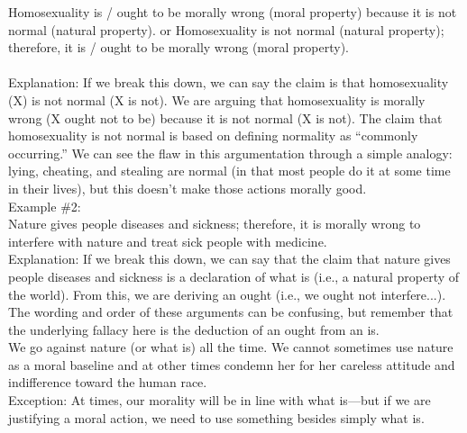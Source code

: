 \documentclass[a4paper,12pt,single,pdftex]{scrartcl}
\begin{document}
{    
       
    
    
      Homosexuality is / ought to be morally wrong (moral property) because it is not normal (natural property). \newline
or \newline
Homosexuality is not normal (natural property); therefore, it is / ought to be morally wrong (moral property).
    \\

    
       
    \\

    
      
        Explanation: If we break this down, we can say the claim is that homosexuality (X) is not normal (X is not). We are arguing that homosexuality is morally wrong (X ought not to be) because it is not normal (X is not). The claim that homosexuality is not normal is based on defining normality as “commonly occurring.” We can see the flaw in this argumentation through a simple analogy: lying, cheating, and stealing are normal (in that most people do it at some time in their lives), but this doesn’t make those actions morally good.
      \\

      
        Example \#2:
      \\

      
        Nature gives people diseases and sickness; therefore, it is morally wrong to interfere with nature and treat sick people with medicine.
      \\

      
        Explanation: If we break this down, we can say that the claim that nature gives people diseases and sickness is a declaration of what is (i.e., a natural property of the world). From this, we are deriving an ought (i.e., we ought not interfere...). The wording and order of these arguments can be confusing, but remember that the underlying fallacy here is the deduction of an ought from an is.
      \\

      
        We go against nature (or what is) all the time. We cannot sometimes use nature as a moral baseline and at other times condemn her for her careless attitude and indifference toward the human race.
      \\

      
        Exception: At times, our morality will be in line with what is—but if we are justifying a moral action, we need to use something besides simply what is.
      \\

}
\end{document}
